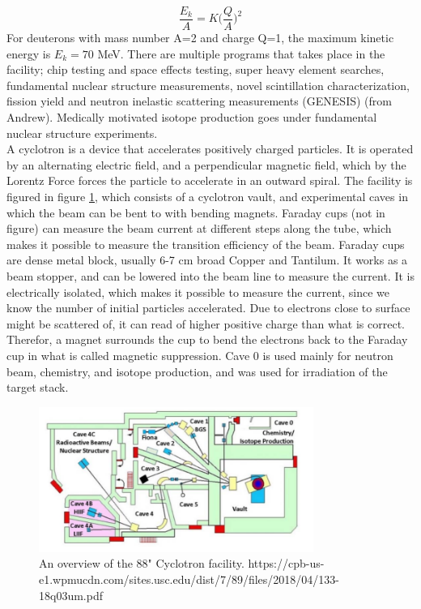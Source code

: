 \documentclass[a4paper,11pt,twoside]{book}
\begin{document}
\begin{equation}
    \frac{E_k}{A}=K\Big(\frac{Q}{A}\Big)^2
\end{equation}
\noindent 
For deuterons with mass number A=2 and charge Q=1, the maximum kinetic energy is $E_k=70$ MeV. There are multiple programs that takes place in the facility; chip testing and space effects testing, super heavy element searches, fundamental nuclear structure measurements, novel scintillation characterization, fission yield and neutron inelastic scattering measurements (GENESIS) (from Andrew). Medically motivated isotope production goes under fundamental nuclear structure experiments. \\

\noindent 
A cyclotron is a device that accelerates positively charged particles. It is operated by an alternating electric field, and a perpendicular magnetic field, which by the Lorentz Force forces the particle to accelerate in an outward spiral. 
The facility is figured in figure \ref{fig:LBNL_88}, which consists of a cyclotron vault, and experimental caves in which the beam can be bent to with bending magnets. Faraday cups (not in figure) can measure the beam current at different steps along the tube, which makes it possible to measure the transition efficiency of the beam. Faraday cups are dense metal block, usually 6-7 cm broad Copper and Tantilum. It works as a beam stopper, and can be lowered into the beam line to measure the current. It is electrically isolated, which makes it possible to measure the current, since we know the number of initial particles accelerated. Due to electrons close to surface might be scattered of, it can read of higher positive charge than what is correct. Therefor, a magnet surrounds the cup to bend the electrons back to the Faraday cup in what is called magnetic suppression. Cave 0 is used mainly for neutron beam, chemistry, and isotope production, and was used for irradiation of the target stack.


\begin{figure}
    \centering
    \includegraphics[width=0.8\textwidth]{Experiment/LBL_88.png}
    \caption{An overview of the 88" Cyclotron facility. https://cpb-us-e1.wpmucdn.com/sites.usc.edu/dist/7/89/files/2018/04/133-18q03um.pdf }
    \label{fig:LBNL_88}
\end{figure}
\end{document}
